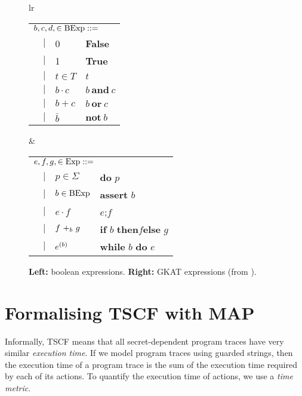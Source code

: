 \begin{figure}[t]
\centering
\begin{tabular}{lr}
\begin{tabular}{rcll}
\multicolumn{4}{l}{$b,c,d, \in \bexp::=$} \\
  &    $|$   &   0   		&  \textbf{False}   \\
  &    $|$   &   1   		&   \textbf{True}   \\
  &    $|$   &    $t\in T$  		&   $t$  \\
  &    $|$   &    $b \cdot c$  	&  $b\ \textbf{and}\ c$   \\
  &    $|$   &    $b+c$  		&  $b\ \textbf{or}\ c $  \\
  &    $|$   &    $\bar{b}$  	& $\textbf{not}\ b$
\end{tabular}&
\begin{tabular}{rcll}
\multicolumn{4}{l}{$e,f,g, \in \gexp::=$} \\
  &    $|$   &  $p \in \Sigma$  		&  \textbf{do} $p$ \\
  &    $|$   &  $ b \in \bexp$   		& \textbf{assert} $b$ \\
  &    $|$   &  $  e \cdot f $ 			& $e${;}$f$   \\
  &    $|$   &  $ \branch{b}{f}{g}$ 	& \textbf{if} $b$ \textbf{then}$f$\textbf{else} $g$\\
  &    $|$   &  $  \iteration{b}{e} $		& \textbf{while} $b$ \textbf{do} $e$
\end{tabular}
\end{tabular}
\caption{\textbf{Left:} boolean expressions.  \textbf{Right:} GKAT expressions (from \cite{GKAT}).}
\label{tab:GKAT}
\end{figure}
\section{Formalising TSCF with MAP}
\label{sec:TSCF}
Informally, TSCF means that all secret-dependent program traces have very similar \emph{execution time}. If we model program traces using guarded strings, then the execution time of a program trace is the sum of the execution time required by each of its actions. To quantify the execution time of actions, we use a \emph{time metric}.  %


